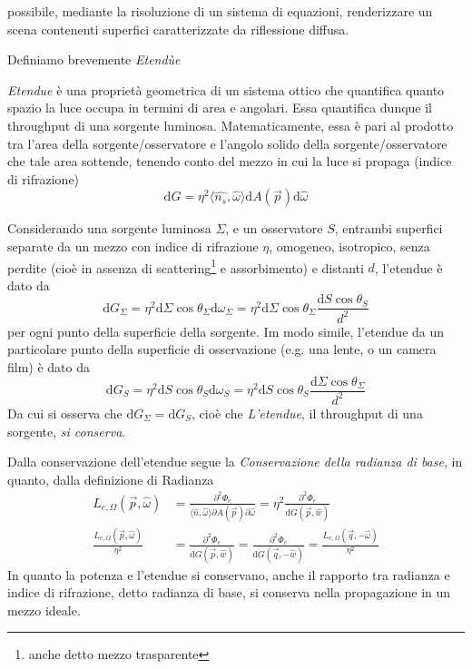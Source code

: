 possibile, mediante la risoluzione di un sistema di equazioni, renderizzare un scena contenenti superfici caratterizzate da riflessione diffusa.\par
Definiamo brevemente \textit{Etend\`ue}
\begin{definitionS}
	\textit{Etendue} \`e una propriet\`a geometrica di un sistema ottico che quantifica quanto spazio la luce occupa in termini di area e angolari.
	Essa quantifica dunque il throughput di una sorgente luminosa. Matematicamente, essa \`e pari al prodotto tra l'area della sorgente/osservatore 
	e l'angolo solido della sorgente/osservatore che tale area sottende, tenendo conto del mezzo in cui la luce si propaga (indice di rifrazione)
	\[ \mathrm{d}G = \eta^2\langle \hat{n_s},\hat{\omega} \rangle\mathrm{d}A(\vec{p})\mathrm{d}\hat{\omega}\]
\end{definitionS}
Considerando una sorgente luminosa $\Sigma$, e un osservatore $S$, entrambi superfici separate da un mezzo con indice di rifrazione $\eta$, omogeneo,
isotropico, senza perdite (cio\`e in assenza di scattering\footnote{anche detto mezzo trasparente} e assorbimento) e distanti $d$, l'etendue \`e dato da
\[ \mathrm{d}G_\Sigma = \eta^2\mathrm{d}\Sigma\cos\theta_\Sigma\mathrm{d}\omega_\Sigma 
					  = \eta^2\mathrm{d}\Sigma\cos\theta_\Sigma\frac{\mathrm{d}S\cos\theta_S}{d^2} \]
per ogni punto della superficie della sorgente. Im modo simile, l'etendue da un particolare punto della superficie di osservazione (e.g. una lente, o
un camera film) \`e dato da
\[ \mathrm{d}G_S = \eta^2\mathrm{d}S\cos\theta_S\mathrm{d}\omega_S 
				 = \eta^2\mathrm{d}S\cos\theta_S\frac{\mathrm{d}\Sigma\cos\theta_\Sigma}{d^2}\]
Da cui si osserva che $\mathrm{d}G_\Sigma = \mathrm{d}G_S$, cio\`e che \textit{L'etendue}, il throughput di una sorgente, \textit{si conserva}.\par
Dalla conservazione dell'etendue segue la \textit{Conservazione della radianza di base}, in quanto, dalla definizione di \gls{Radianza}
\begin{align} \label{chapter1:basicRadiance}
	L_{e,\Omega}(\vec{p}, \hat{\omega}) &= \frac{\partial^2\Phi_e}{\langle\hat{n},\hat{\omega}\rangle\partial A(\vec{p})\partial\hat{\omega}} 
						   = \eta^2\frac{\partial^2\Phi_e}{\mathrm{d}G(\vec{p},\hat{w})}\\
	\frac{L_{e,\Omega}(\vec{p}, \hat{\omega})}{\eta^2} &= \frac{\partial^2\Phi_e}{\mathrm{d}G(\vec{p},\hat{w})}
		= \frac{\partial^2\Phi_e}{\mathrm{d}G(\vec{q},-\hat{w})} = \frac{L_{e,\Omega}(\vec{q}, -\hat{\omega})}{\eta^2}
\end{align}
In quanto la potenza e l'etendue si conservano, anche il rapporto tra radianza e indice di rifrazione, detto radianza di base, si conserva nella 
propagazione in un mezzo ideale.\par
